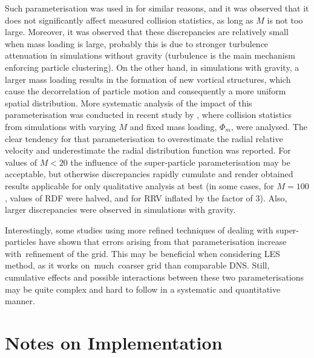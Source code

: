 \documentclass{pracamgren}
\begin{document}
Such parameterisation was used in \textcite{Rosa2020} for similar reasons, and it was observed that it does not significantly affect measured collision statistics, as long as $M$ is not too large.
Moreover, it was observed that these discrepancies are relatively small when mass loading is large, probably this is due to stronger turbulence attenuation in simulations without gravity (turbulence is the main mechanism enforcing particle clustering).
On the other hand, in simulations with gravity, a larger mass loading results in the formation of new vortical structures, which cause the decorrelation of particle motion and consequently a more uniform spatial distribution.
More systematic analysis of the impact of this parameterisation was conducted in recent study by \textcite{Rosa2022}, where collision statistics from simulations with varying $M$ and fixed mass loading, $\Phi_m$, were analysed.
The clear tendency for that parameterisation to overestimate the radial relative velocity and underestimate the radial distribution function was reported.
For values of $M < 20$ the influence of the super-particle parameterisation may be acceptable, but otherwise discrepancies rapidly cumulate and render obtained results applicable for only qualitative analysis at best (in some cases, for $M = 100$, values of RDF were halved, and for RRV inflated by the factor of $3$).
Also, larger discrepancies were observed in simulations with gravity. 

Interestingly, some studies using more refined techniques of dealing with super-particles \parencite{Garg2009} have shown that errors arising from that parameterisation increase with~refinement of the grid.
This may be beneficial when considering LES method, as it works on~much~coarser grid than comparable DNS.
Still, cumulative effects and possible interactions between these two parameterisations may be quite complex and hard to follow in a systematic and quantitative manner.



\section{Notes on Implementation}
\label{sc:ch1.impl}
\end{document}
